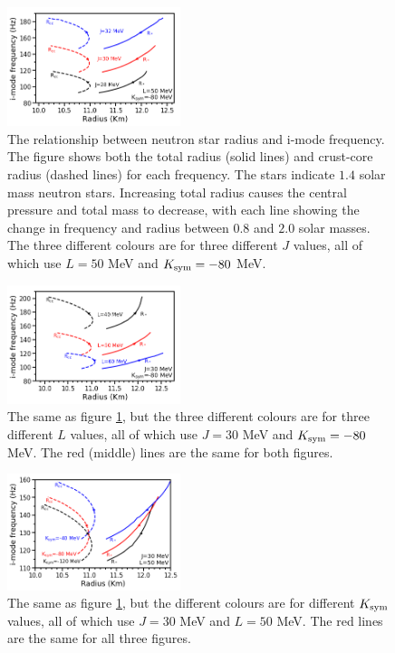 \documentclass[fleqn,usenatbib]{mnras}
\begin{document}
\begin{figure}
\centering
\includegraphics[width=0.45\textwidth,angle=0]{f_Rcc_Rstar_J_grid.png}
\caption{The relationship between neutron star radius and i-mode frequency. The figure shows both the total radius (solid lines) and crust-core radius (dashed lines) for each frequency. The stars indicate $1.4$ solar mass neutron stars. Increasing total radius causes the central pressure and total mass to decrease, with each line showing the change in frequency and radius between $0.8$ and $2.0$ solar masses. The three different colours are for three different $J$ values, all of which use $L=50$ MeV and $K_{\rm sym}=-80$ MeV.}
\label{fig:f_vs_R_varyJ}
\end{figure}

\begin{figure}
\centering
\includegraphics[width=0.45\textwidth,angle=0]{f_Rcc_Rstar_L_grid.png}
\caption{The same as figure \ref{fig:f_vs_R_varyJ}, but the three different colours are for three different $L$ values, all of which use $J=30$ MeV and $K_{\rm sym}=-80$ MeV. The red (middle) lines are the same for both figures.}
\label{fig:f_vs_R_varyL}
\end{figure}

\begin{figure}
\centering
\includegraphics[width=0.45\textwidth,angle=0]{f_Rcc_Rstar_K_grid.png}
\caption{The same as figure \ref{fig:f_vs_R_varyJ}, but the different colours are for different $K_{\rm sym}$ values, all of which use $J=30$ MeV and $L=50$ MeV. The red lines are the same for all three figures.}
\label{fig:f_vs_R_varyK}
\end{figure}
\end{document}
